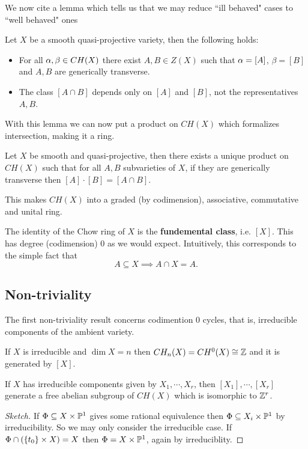 We now cite a lemma which tells us that we may reduce ``ill behaved" cases to ``well behaved" ones

\begin{lemma}
Let $X$ be a smooth quasi-projective variety, then the following holds:
\begin{itemize}
\item For all $\alpha,\beta\in CH(X)$ there exist $A,B\in Z(X)$ such that $\alpha=[A]$, $\beta=[B]$ and $A,B$ are generically transverse.
\item The class $[A\cap B]$ depends only on $[A]$ and $[B]$, not the representatives $A,B$.
\end{itemize}
\end{lemma}

With this lemma we can now put a product on $CH(X)$ which formalizes intersection, making it a ring.

\begin{theorem}
Let $X$ be smooth and quasi-projective, then there exists a unique product on $CH(X)$ such that for all $A,B$ subvarieties of $X$, if they are generically transverse then $[A]\cdot [B]=[A\cap B]$.

This makes $CH(X)$ into a graded (by codimension), associative, commutative and unital ring.
\end{theorem}

\begin{remark}
The identity of the Chow ring of $X$ is the \textbf{fundemental class}, i.e. $[X]$. This has degree (codimension) $0$ as we would expect. Intuitively, this corresponds to the simple fact that
\[A\subseteq X\implies A\cap X=A.\]
\end{remark}


\subsection{Non-triviality}

The first non-triviality result concerns codimention 0 cycles, that is, irreducible components of the ambient variety.
\begin{theorem}
If $X$ is irreducible and $\dim X=n$ then $CH_n(X)=CH^0(X)\cong \mathbb{Z}$ and it is generated by $[X]$.

If $X$ has irreducible components given by $X_1,\cdots, X_r$, then $[X_1],\cdots, [X_r]$ generate a free abelian subgroup of $CH(X)$ which is isomorphic to $\mathbb{Z}^r$.
\end{theorem}
\begin{proof}[Sketch]
If $\Phi\subseteq X\times \mathbb{P}^1$ gives some rational equivalence then $\Phi\subseteq X_i\times \mathbb{P}^1$ by irreducibility. So we may only consider the irreducible case.
If $\Phi\cap (\left\{{t_0}\right\}\times X)=X$ then $\Phi=X\times \mathbb{P}^1$, again by irreduciblity.
\end{proof}

